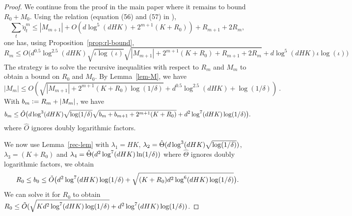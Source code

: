 \begin{proof}
We continue from the proof in the main paper where it remains to bound $R_0 + M_0$.
Using the relation  (equation (56) and (57) in \citep{zhang21variance}),
\begin{equation*}
    \sum_{t}\breve \eta_{t}^m \le |M_{m+1}|+O(d\log^5(dHK)+2^{m+1}(K+R_0))+R_{m+1}+2R_m,
\end{equation*}
one has, using Proposition~\ref{prop:rl-bound}, 
\begin{equation*} 
    R_m\le O\big(d^{0.5}   \log^{2.5}(dHK)\sqrt{\iota\log(\iota)}\sqrt{|M_{m+1}|+2^{m+1}(K+R_0)+R_{m+1}+2R_m}+d \log^{5}(dHK) \iota\log(\iota)) 
\end{equation*}
The strategy is to solve the recursive inequalities with respect to $R_m$ and $M_m$ to obtain a bound on $R_0$ and $M_0$.
By Lemma~\ref{lem-M}, we have
\begin{equation}\label{boot2}
|M_m| \le O(\sqrt{|M_{m+1}| + 2^{m+1}(K+R_0)\log(1/\delta)}+d^{0.5}\log^{2.5}(dHK) + \log(1/\delta))~.
\end{equation}
With $b_m :=R_m+|M_m|$, we have
\begin{equation*}
    b_m 
    \le 
    \hat O\big(d \log^{3}(dHK) \sqrt{\log(1/{\delta})}\sqrt{b_m+b_{m+1}+2^{m+1}(K+R_0)} + d^{2} \log^{7}(dHK)\log (1/{\delta}) \big).
\end{equation*}
where $\hat O$ ignores doubly logarithmic factors. 

We now use Lemma~\ref{rec-lem} with $\lambda_1=HK$, $\lambda_2= \hat\Theta(d\log^{3}(dHK)\sqrt{\log (1/{\delta})})$, $\lambda_3=(K+R_0)$ and $\lambda_4=\hat\Theta(d^{2} \log^{7}(dHK)\ln(1/{\delta}))$ where $\hat\Theta$ ignores doubly logarithmic factors, we obtain
\begin{equation*}
    R_0\le b_0 \le \tilde O\big(d^{2}\log^{7}(dHK)\log (1/{\delta})+\sqrt{(K+R_0)d^2\log^6(dHK)\log(1/{\delta})}\big).
\end{equation*}
We can solve it for $R_0$ to obtain $R_0\le \tilde O(\sqrt{K d^2\log^7(dHK)\log(1/{\delta})} + d^{2}\log^{7}(dHK)\log (1/{\delta}))$. 


\end{proof}
